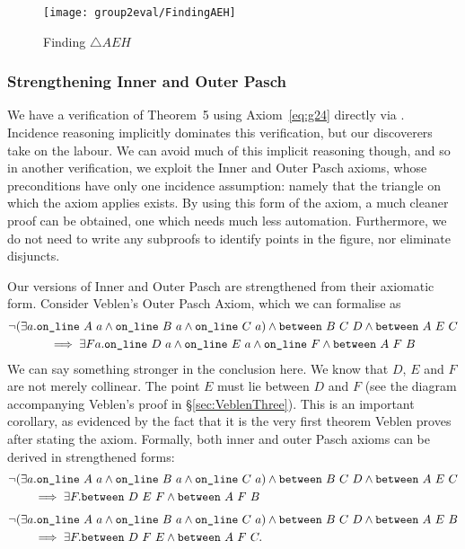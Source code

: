 \begin{figure}
\centering\texttt{[image: group2eval/FindingAEH]}
\caption{Finding $\triangle AEH$}
\label{fig:FindingAEH}
\end{figure}

\subsubsection{Strengthening Inner and Outer Pasch}
We have a verification of Theorem~5 using Axiom~\ref{eq:g24} directly via . Incidence reasoning implicitly dominates this verification, but our discoverers take on the labour. We can avoid much of this implicit reasoning though, and so in another verification, we exploit the Inner and Outer Pasch axioms, whose preconditions have only one incidence assumption: namely that the triangle on which the axiom applies exists. By using this form of the axiom, a much cleaner proof can be obtained, one which needs much less automation. Furthermore, we do not need to write any subproofs to identify points in the figure, nor eliminate disjuncts.

Our versions of Inner and Outer Pasch are strengthened from their axiomatic form. Consider Veblen's Outer Pasch Axiom, which we can formalise as
\begin{multline}
  \neg(\exists a.\texttt{on\_line}\ A\ a\wedge \texttt{on\_line}\ B\ a\wedge \texttt{on\_line}\ C\ a) \wedge \texttt{between}\ B\ C\ D \wedge \texttt{between}\ A\ E\ C\\ \implies \exists F a.  \texttt{on\_line}\ D\ a \wedge \texttt{on\_line}\ E\ a \wedge \texttt{on\_line}\ F \wedge \texttt{between}\ A\ F\ B
\end{multline}
We can say something stronger in the conclusion here. We know that $D$, $E$ and $F$ are not merely collinear. The point $E$ must lie between $D$ and $F$ (see the diagram accompanying Veblen's proof in \S\ref{sec:VeblenThree}). This is an important corollary, as evidenced by the fact that it is the very first theorem Veblen proves after stating the axiom. Formally, both inner and outer Pasch axioms can be derived in strengthened forms:
\begin{equation}\label{eq:OuterPasch}
  \begin{split}
    &\neg(\exists a.\texttt{on\_line}\ A\ a\wedge \texttt{on\_line}\ B\ a\wedge \texttt{on\_line}\ C\ a) \wedge \texttt{between}\ B\ C\ D \wedge \texttt{between}\ A\ E\ C\\ 
    &\qquad\implies \exists F. \texttt{between}\ D\ E\ F \wedge \texttt{between}\ A\ F\ B
  \end{split}
\end{equation}
\begin{equation}\label{eq:InnerPasch}
  \begin{split}
    &\neg(\exists a.\texttt{on\_line}\ A\ a\wedge \texttt{on\_line}\ B\ a\wedge \texttt{on\_line}\ C\ a) \wedge \texttt{between}\ B\ C\ D \wedge \texttt{between}\ A\ E\ B\\ 
    &\qquad\implies \exists F. \texttt{between}\ D\ F\ E \wedge \texttt{between}\ A\ F\ C.
  \end{split}
\end{equation}

